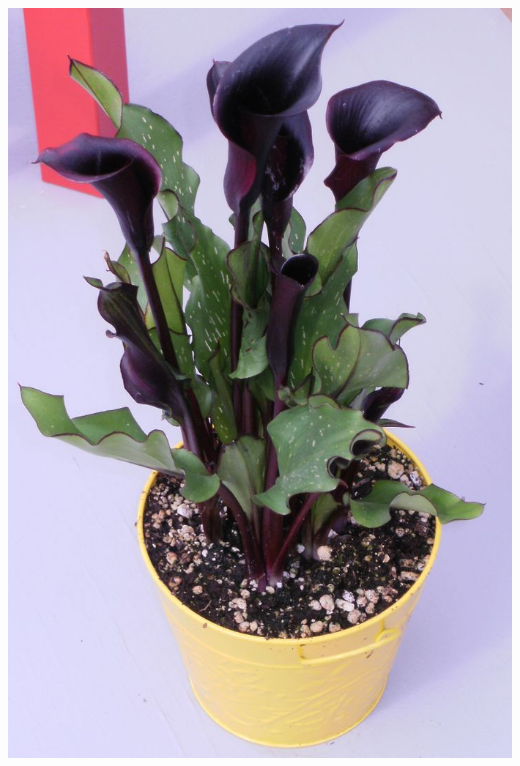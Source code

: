 \documentclass{article}
\begin{document}
\begin{center}
\includegraphics[width=0.9\textheight, angle=90]{../CallaLily_black.jpg}
\end{center}
\newpage
\end{document}
